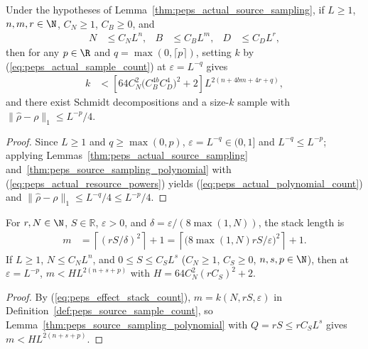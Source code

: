 \begin{lemma}
    \label{thm:peps_actual_source_polynomial}
    \leanok
    Under the hypotheses of Lemma~\ref{thm:peps_actual_source_sampling}, if
    $L\geq1$, $n,m,r\in\N$, $C_N\geq1$, $C_B\geq0$, and
    \begin{align}
        N & \leq C_N L^n,
          & B             & \leq C_B L^m,
          & D             & \leq C_D L^r,
        \label{eq:peps_actual_resource_powers}
    \end{align}
    then for any $p\in\R$ and $q=\max(0,\lceil p\rceil)$, setting $k$ by
    (\ref{eq:peps_actual_sample_count}) at $\varepsilon=L^{-q}$ gives
    \begin{align}
        k & < \left[64C_N^2\bigl(C_B^{4b}C_D^4\bigr)^2+2\right]
        L^{2(n+4bm+4r+q)},
        \label{eq:peps_actual_polynomial_count}
    \end{align}
    and there exist Schmidt decompositions and a size-$k$ sample with
    $\|\widehat\rho-\rho\|_1\leq L^{-p}/4$.
\end{lemma}
\begin{proof}
    \leanok
    Since $L\ge 1$ and $q\ge\max(0,p)$, $\varepsilon=L^{-q}\in(0,1]$ and
    $L^{-q}\le L^{-p}$; applying Lemmas~\ref{thm:peps_actual_source_sampling}
    and~\ref{thm:peps_source_sampling_polynomial} with
    (\ref{eq:peps_actual_resource_powers}) yields
    (\ref{eq:peps_actual_polynomial_count}) and $\|\widehat\rho-\rho\|_1\le L^{-q}/4\le L^{-p}/4$.
\end{proof}

\begin{lemma}
    \label{thm:peps_effect_stack_polynomial}
    \leanok
    For $r,N\in\N$, $S\in\mathbb R$, $\varepsilon>0$, and
    $\delta=\varepsilon/(8\max(1,N))$, the stack length is
    \begin{align}
        m & = \left\lceil(rS/\delta)^2\right\rceil+1
        = \left\lceil
        \bigl(8\max(1,N)rS/\varepsilon\bigr)^2
        \right\rceil+1.
        \label{eq:peps_effect_stack_count}
    \end{align}
    If $L\geq1$, $N\leq C_NL^n$, and $0\leq S\leq C_SL^s$ ($C_N\geq1$,
    $C_S\geq0$, $n,s,p\in\N$), then at $\varepsilon=L^{-p}$,
    $m<H L^{2(n+s+p)}$ with $H=64C_N^2(rC_S)^2+2$.
\end{lemma}
\begin{proof}
    \leanok
    By (\ref{eq:peps_effect_stack_count}), $m=k(N,rS,\varepsilon)$ in
    Definition~\ref{def:peps_source_sample_count}, so
    Lemma~\ref{thm:peps_source_sampling_polynomial} with $Q=rS\le rC_SL^s$
    gives $m<HL^{2(n+s+p)}$.
\end{proof}

